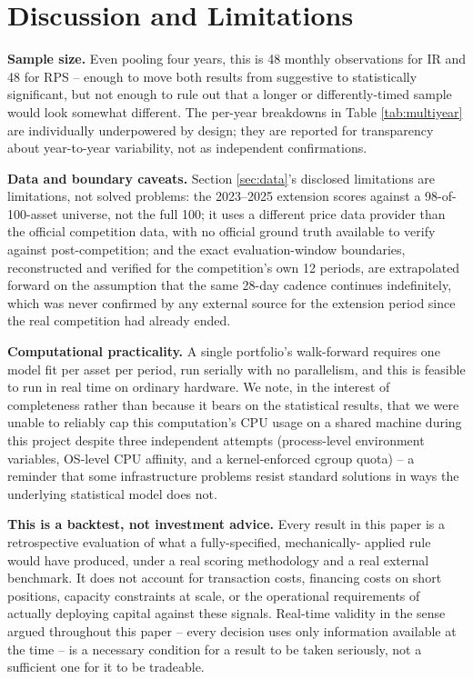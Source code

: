\documentclass[11pt]{article}
\begin{document}
\section{Discussion and Limitations}
\label{sec:discussion}

\textbf{Sample size.} Even pooling four years, this is 48 monthly
observations for IR and 48 for RPS -- enough to move both results from
suggestive to statistically significant, but not enough to rule out that a
longer or differently-timed sample would look somewhat different. The
per-year breakdowns in Table \ref{tab:multiyear} are individually
underpowered by design; they are reported for transparency about
year-to-year variability, not as independent confirmations.

\textbf{Data and boundary caveats.} Section \ref{sec:data}'s disclosed
limitations are limitations, not solved problems: the 2023--2025 extension
scores against a 98-of-100-asset universe, not the full 100; it uses a
different price data provider than the official competition data, with no
official ground truth available to verify against post-competition; and the
exact evaluation-window boundaries, reconstructed and verified for the
competition's own 12 periods, are extrapolated forward on the assumption that
the same 28-day cadence continues indefinitely, which was never confirmed by
any external source for the extension period since the real competition had
already ended.

\textbf{Computational practicality.} A single portfolio's walk-forward
requires one model fit per asset per period, run serially with no
parallelism, and this is feasible to run in real time on ordinary hardware.
We note, in the interest of completeness rather than because it bears on the
statistical results, that we were unable to reliably cap this computation's
CPU usage on a shared machine during this project despite three independent
attempts (process-level environment variables, OS-level CPU affinity, and a
kernel-enforced cgroup quota) -- a reminder that some infrastructure problems
resist standard solutions in ways the underlying statistical model does not.

\textbf{This is a backtest, not investment advice.} Every result in this
paper is a retrospective evaluation of what a fully-specified, mechanically-
applied rule would have produced, under a real scoring methodology and a real
external benchmark. It does not account for transaction costs, financing
costs on short positions, capacity constraints at scale, or the operational
requirements of actually deploying capital against these signals. Real-time
validity in the sense argued throughout this paper -- every decision uses
only information available at the time -- is a necessary condition for a
result to be taken seriously, not a sufficient one for it to be tradeable.
\end{document}
